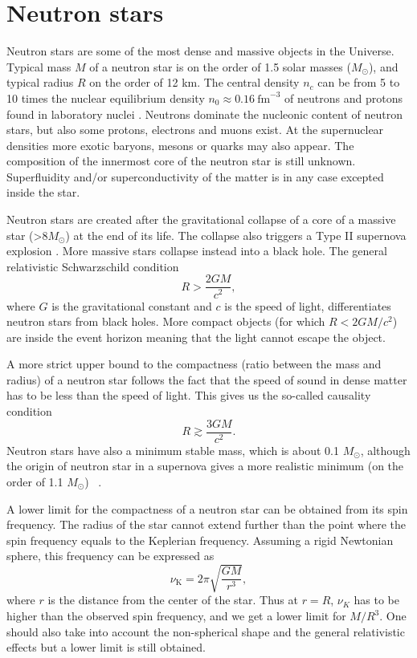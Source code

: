 \documentclass{wihuri}
\def\be{\begin{equation}}
\def\ee{\end{equation}}
\begin{document}
\section{Neutron stars}


Neutron stars are some of the most dense and massive objects in the
Universe. Typical mass $M$ of a neutron star is on the order of 1.5 solar masses ($M_{\odot}$), and typical radius $R$ on the order of 12 km. The central density $n_{c}$ can be from 5 to 10 times the nuclear equilibrium density $n_{0} \approx 0.16 ~\mathrm{fm}^{-3}$ of neutrons and protons found in laboratory nuclei \cite{lattimer}. Neutrons dominate the nucleonic content of neutron stars, but also some protons, electrons and muons exist. At the supernuclear densities more exotic baryons, mesons or quarks may also appear. The composition of the innermost core of the neutron star is still unknown. Superfluidity and/or superconductivity of the matter %
is in any case excepted inside the star. 

 
Neutron stars are created after the gravitational collapse of a core of a
massive star (>8$M_{\odot}$) at the end of its life. The collapse also triggers a Type II supernova explosion \cite{lattimer}. More massive stars collapse instead into a black hole. The general relativistic Schwarzschild condition 
\be \label{eq:schw_cond}
 R > \frac{2GM}{c^{2}},
\ee 
where $G$ is the gravitational constant and $c$ is the speed of light, %
differentiates neutron stars from black holes. More compact objects (for which $R < 2GM/c^{2}$) are inside the event horizon meaning that the light cannot escape the object.


A more strict upper bound to the compactness (ratio between the mass and radius) of a neutron star follows
the fact \cite{rhoades} %
that the speed of sound in dense matter has to be less than the speed of light. This gives us the so-called causality condition
\be \label{eq:causality}
 R \gtrsim \frac{3GM}{c^{2}}.
\ee 
Neutron stars have also a minimum stable mass, which is about 0.1 $M_{\odot}$, although the origin of neutron star in a supernova gives a more realistic minimum (on the order of 1.1 $M_{\odot}$) ~\cite{lattimer2013}.

A lower limit for the compactness of a neutron star can be obtained from its spin frequency. The radius of the star cannot extend further than the point where the spin frequency equals to the Keplerian frequency. Assuming a rigid Newtonian sphere, this frequency can be expressed as
\be \label{eq:keplerian}
\nu_{\mathrm{K}} = 2 \pi \sqrt{\frac{GM}{r^{3}}},
\ee 
where $r$ is the distance from the center of the star. Thus at $r=R$, $\nu_{K}$ has to be higher than the observed spin frequency, and we get a lower limit for $M/R^{3}$. One should also take into account the non-spherical shape and the general relativistic effects but a lower limit is still obtained.
\end{document}

